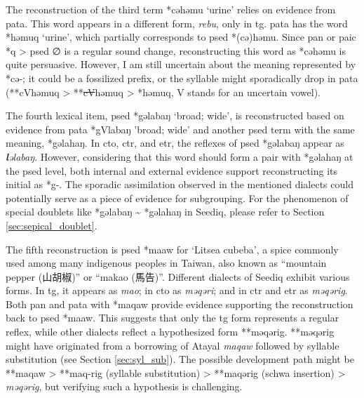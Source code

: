The reconstruction of the third term *cəhəmu `urine' relies on evidence from \acl{pata}. This word appears in a different form, \textit{rebu}, only in \acl{tg}. \acl{pata} has the word *həmuq `urine', which partially corresponds to \acl{psed} *(cə)həmu. Since \acl{pan} or \acl{paic} *q > \acl{psed} ∅ is a regular sound change, reconstructing this word as *cəhəmu is quite persuasive. However, I am still uncertain about the meaning represented by *cə-; it could be a fossilized prefix, or the syllable might sporadically drop in \acl{pata} (**cVhəmuq > **\sout{cV}həmuq > *həmuq, V stands for an uncertain vowel).

The fourth lexical item, \acl{psed} *gəlabaŋ `broad; wide', is reconstructed based on evidence from \acl{pata} *gVlabaŋ 'broad; wide' and another \acs{psed} term with the same meaning, *gəlahaŋ. In \acl{cto}, \acl{ctr}, and \acl{etr}, the reflexes of \acl{psed} *gəlabaŋ appear as \textit{\textbf{l}əlabaŋ}. However, considering that this word should form a pair with *gəlahaŋ at the \acl{psed} level, both internal and external evidence support reconstructing its initial as *g-. The sporadic assimilation observed in the mentioned dialects could potentially serve as a piece of evidence for subgrouping. For the phenomenon of special doublets like *gəlabaŋ \~{} *gəlahaŋ in Seediq, please refer to Section \ref{sec:sepical_doublet}.

The fifth reconstruction is \acl{psed} *maaw for `Litsea cubeba', a spice commonly used among many indigenous peoples in Taiwan, also known as ``mountain pepper (山胡椒)'' or ``makao (馬告)''. Different dialects of Seediq exhibit various forms. In \acl{tg}, it appears as \textit{mao}; in \acl{cto} as \textit{məqəri}; and in \acl{ctr} and \acl{etr} as \textit{məqərig}. Both \acl{pan} and \acl{pata} with *maqaw provide evidence supporting the reconstruction back to \acl{psed} *maaw. This suggests that only the \acl{tg} form represents a regular reflex, while other dialects reflect a hypothesized form **məqərig. **məqərig might have originated from a borrowing of Atayal \textit{maqaw} followed by syllable substitution (see Section \ref{sec:syl_sub}). The possible development path might be **maqaw > **maq-rig (syllable substitution) > **maqərig (schwa insertion) > \textit{məqərig}, but verifying such a hypothesis is challenging.


